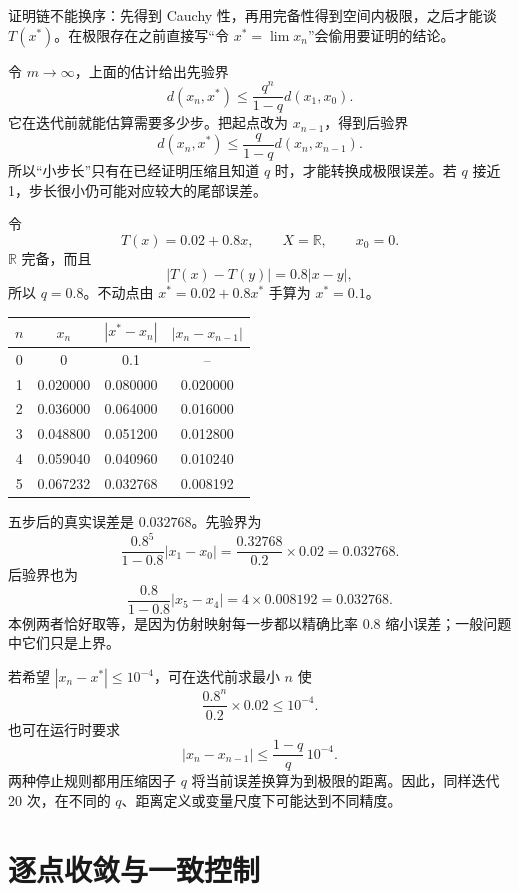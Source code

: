 证明链不能换序：先得到 Cauchy 性，再用完备性得到空间内极限，之后才能谈 $T(x^*)$。在极限存在之前直接写“令 $x^*=\lim x_n$”会偷用要证明的结论。


令 $m\to\infty$，上面的估计给出先验界
\[
  d(x_n,x^*)\leq\frac{q^n}{1-q}d(x_1,x_0).
\]
它在迭代前就能估算需要多少步。把起点改为 $x_{n-1}$，得到后验界
\[
  d(x_n,x^*)\leq\frac{q}{1-q}d(x_n,x_{n-1}).
\]
所以“小步长”只有在已经证明压缩且知道 $q$ 时，才能转换成极限误差。若 $q$ 接近 1，步长很小仍可能对应较大的尾部误差。


令
\[
  T(x)=0.02+0.8x,\qquad X=\mathbb R,\qquad x_0=0.
\]
$\mathbb R$ 完备，而且
\[
 |T(x)-T(y)|=0.8|x-y|,
\]
所以 $q=0.8$。不动点由 $x^*=0.02+0.8x^*$ 手算为 $x^*=0.1$。

\begin{center}
\begin{tabular}{cccc}
\toprule
$n$ & $x_n$ & $|x^*-x_n|$ & $|x_n-x_{n-1}|$ \\
\midrule
0 & 0 & 0.1 & -- \\
1 & 0.020000 & 0.080000 & 0.020000 \\
2 & 0.036000 & 0.064000 & 0.016000 \\
3 & 0.048800 & 0.051200 & 0.012800 \\
4 & 0.059040 & 0.040960 & 0.010240 \\
5 & 0.067232 & 0.032768 & 0.008192 \\
\bottomrule
\end{tabular}
\end{center}

五步后的真实误差是 $0.032768$。先验界为
\[
 \frac{0.8^5}{1-0.8}|x_1-x_0|
 =\frac{0.32768}{0.2}\times0.02=0.032768.
\]
后验界也为
\[
 \frac{0.8}{1-0.8}|x_5-x_4|=4\times0.008192=0.032768.
\]
本例两者恰好取等，是因为仿射映射每一步都以精确比率 $0.8$ 缩小误差；一般问题中它们只是上界。


若希望 $|x_n-x^*|\leq10^{-4}$，可在迭代前求最小 $n$ 使
\[
 \frac{0.8^n}{0.2}\times0.02\leq10^{-4}.
\]
也可在运行时要求
\[
 |x_n-x_{n-1}|\leq\frac{1-q}{q}\,10^{-4}.
\]
两种停止规则都用压缩因子 $q$ 将当前误差换算为到极限的距离。因此，同样迭代 20 次，在不同的 $q$、距离定义或变量尺度下可能达到不同精度。

\section{逐点收敛与一致控制}

